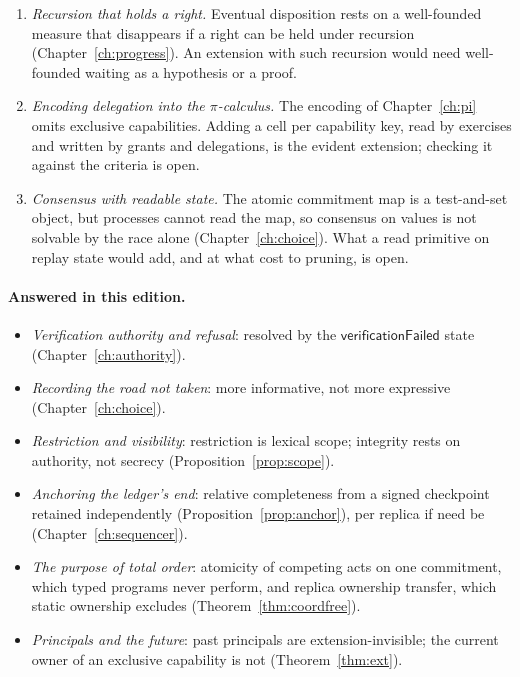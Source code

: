 \documentclass[11pt,openany]{book}
\theoremstyle{remark}
\begin{document}
\begin{enumerate}[leftmargin=1.5em]
commitment to a new owner, and revocation of a delegated capability, both
require agreement on an order between competing acts
(Chapters~\ref{ch:sequencer} and~\ref{ch:authority}). Neither is in the
core calculus.
\item \emph{Recursion that holds a right.} Eventual disposition rests on a
well-founded measure that disappears if a right can be held under
recursion (Chapter~\ref{ch:progress}). An extension with such recursion
would need well-founded waiting as a hypothesis or a proof.
\item \emph{Encoding delegation into the $\pi$-calculus.} The encoding of
Chapter~\ref{ch:pi} omits exclusive capabilities. Adding a cell per
capability key, read by exercises and written by grants and delegations,
is the evident extension; checking it against the criteria is open.
\item \emph{Consensus with readable state.} The atomic commitment map is
a test-and-set object, but processes cannot read the map, so consensus on
values is not solvable by the race alone (Chapter~\ref{ch:choice}). What a
read primitive on replay state would add, and at what cost to pruning, is
open.
\end{enumerate}

\paragraph{Answered in this edition.}
\begin{itemize}[leftmargin=1.5em]
\item \emph{Verification authority and refusal}: resolved by the
$\mathsf{verificationFailed}$ state (Chapter~\ref{ch:authority}).
\item \emph{Recording the road not taken}: more informative, not more
expressive (Chapter~\ref{ch:choice}).
\item \emph{Restriction and visibility}: restriction is lexical scope;
integrity rests on authority, not secrecy (Proposition~\ref{prop:scope}).
\item \emph{Anchoring the ledger's end}: relative completeness from a
signed checkpoint retained independently (Proposition~\ref{prop:anchor}),
per replica if need be (Chapter~\ref{ch:sequencer}).
\item \emph{The purpose of total order}: atomicity of competing acts on one
commitment, which typed programs never perform, and replica ownership
transfer, which static ownership excludes
(Theorem~\ref{thm:coordfree}).
\item \emph{Principals and the future}: past principals are
extension-invisible; the current owner of an exclusive capability is not
(Theorem~\ref{thm:ext}).
\end{itemize}
\end{document}
